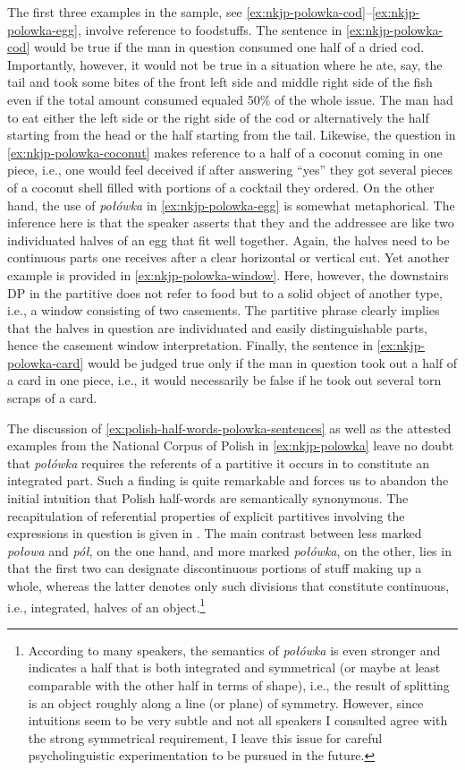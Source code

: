 The first three examples in the sample, see \ref{ex:nkjp-polowka-cod}--\ref{ex:nkjp-polowka-egg}, involve reference to foodstuffs. The sentence in \ref{ex:nkjp-polowka-cod} would be true if the man in question consumed one half of a dried cod. Importantly, however, it would not be true in a situation where he ate, say, the tail and took some bites of the front left side and middle right side of the fish even if the total amount consumed equaled 50\% of the whole issue. The man had to eat either the left side or the right side of the cod or alternatively the half starting from the head or the half starting from the tail. Likewise, the question in \ref{ex:nkjp-polowka-coconut} makes reference to a half of a coconut coming in one piece, i.e., one would feel deceived if after answering ``yes'' they got several pieces of a coconut shell filled with portions of a cocktail they ordered. On the other hand, the use of \textit{połówka} in \ref{ex:nkjp-polowka-egg} is somewhat metaphorical. The inference here is that the speaker asserts that they and the addressee are like two individuated halves of an egg that fit well together. Again, the halves need to be continuous parts one receives after a clear horizontal or vertical cut. Yet another example is provided in \ref{ex:nkjp-polowka-window}. Here, however, the downstairs DP in the partitive does not refer to food but to a solid object of another type, i.e., a window consisting of two casements. The partitive phrase clearly implies that the halves in question are individuated and easily distinguishable parts, hence the casement window interpretation. Finally, the sentence in \ref{ex:nkjp-polowka-card} would be judged true only if the man in question took out a half of a card in one piece, i.e., it would necessarily be false if he took out several torn scraps of a card.

The discussion of \ref{ex:polish-half-words-polowka-sentences} as well as the attested examples from the National Corpus of Polish in \ref{ex:nkjp-polowka} leave no doubt that \textit{połówka} requires the referents of a partitive it occurs in to constitute an integrated part. Such a finding is quite remarkable and forces us to abandon the initial intuition that Polish half-words are semantically synonymous. The recapitulation of referential properties of explicit partitives involving the expressions in question is given in . The main contrast between less marked \textit{połowa} and \textit{pół}, on the one hand, and more marked \textit{połówka}, on the other, lies in that the first two can designate discontinuous portions of stuff making up a whole, whereas the latter denotes only such divisions that constitute continuous, i.e., integrated, halves of an object.\footnote{According to many speakers, the semantics of \textit{połówka} is even stronger and indicates a half that is both integrated and symmetrical (or maybe at least comparable with the other half in terms of shape), i.e., the result of splitting is an object roughly along a line (or plane) of symmetry. However, since intuitions seem to be very subtle and not all speakers I consulted agree with the strong symmetrical requirement, I leave this issue for careful psycholinguistic experimentation to be pursued in the future.}

